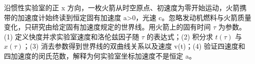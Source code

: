 沿惯性实验室的正 x 方向，一枚火箭从时空原点、初速度为零开始运动，火箭携带的加速度计始终读到恒定固有加速度 a>0，光速 c。忽略发动机燃料与火箭质量变化，只研究由给定固有加速度规定的世界线。用火箭上的固有时间 \(\tau \) 为参数。
(1) 定义快度并求实验室速度和洛伦兹因子随 \(\tau \) 的表达式；(2) 积分求 \(t(\tau )\) 与 \(x(\tau )\)；(3) 消去参数得到世界线的双曲线关系以及速度 v(t)；(4) 验证四速度和四加速度的闵氏范数，解释为何实验室坐标加速度不是恒定 a。
